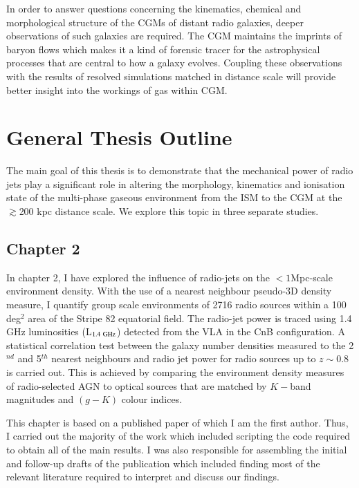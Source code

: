 In order to answer questions concerning the kinematics, chemical and morphological structure of the CGMs of distant radio galaxies, deeper observations of such galaxies are required. The CGM maintains the imprints of baryon flows which makes it a kind of forensic tracer for the astrophysical processes that are central to how a galaxy evolves. Coupling these observations with the results of resolved simulations matched in distance scale will provide better insight into the workings of gas within CGM.

\section{General Thesis Outline}

The main goal of this thesis is to demonstrate that the mechanical power of radio jets play a significant role in altering the morphology, kinematics and ionisation state of the multi-phase gaseous environment from the ISM to the CGM at the $\gtrsim$200 kpc distance scale. We explore this topic in three separate studies. 

\subsection{Chapter 2}
In chapter 2, I have explored the influence of radio-jets on the $<1$Mpc-scale environment density. With the use of a nearest neighbour pseudo-3D density measure, I quantify group scale environments of 2716 radio sources within a 100 deg$^2$ area of the Stripe 82 equatorial field. The radio-jet power is traced using 1.4 GHz luminosities (L$_{1.4~\rm GHz}$) detected from the VLA in the CnB configuration. A statistical correlation test between the galaxy number densities measured to the 2$^{nd}$ and 5$^{th}$ nearest neighbours and radio jet power for radio sources up to $z \sim 0.8$ is carried out. This is achieved by comparing the environment density measures of radio-selected AGN to optical sources that are matched by $K-$band magnitudes and $(g-K)$ colour indices. 

This chapter is based on a published paper of which I am the first author. Thus, I carried out the majority of the work which included scripting the  code required to obtain all of the main results. I was also responsible for assembling the initial and follow-up drafts of the publication which included finding most of the relevant literature required to interpret and discuss our findings. 

